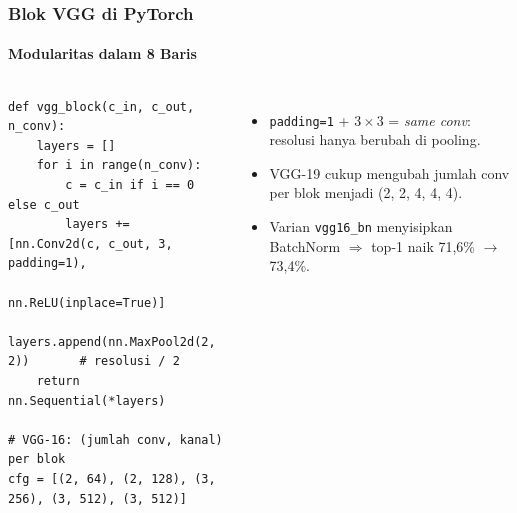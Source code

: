 \documentclass[t,aspectratio=169,xcolor=dvipsnames]{beamer}
\begin{document}
\begin{frame}[fragile]
    \frametitle{Blok VGG di PyTorch}
    \framesubtitle{Modularitas dalam 8 Baris}
    \footnotesize

    \begin{columns}[T]
\begin{lstlisting}[style=py]
def vgg_block(c_in, c_out, n_conv):
    layers = []
    for i in range(n_conv):
        c = c_in if i == 0 else c_out
        layers += [nn.Conv2d(c, c_out, 3, padding=1),
                   nn.ReLU(inplace=True)]
    layers.append(nn.MaxPool2d(2, 2))       # resolusi / 2
    return nn.Sequential(*layers)

# VGG-16: (jumlah conv, kanal) per blok
cfg = [(2, 64), (2, 128), (3, 256), (3, 512), (3, 512)]
\end{lstlisting}

        \begin{itemize}
            \item \texttt{padding=1} + $3\times3$ = \textit{same conv}: resolusi hanya berubah di pooling.
            \item VGG-19 cukup mengubah jumlah conv per blok menjadi (2, 2, 4, 4, 4).
            \item Varian \texttt{vgg16\_bn} menyisipkan BatchNorm $\Rightarrow$ top-1 naik 71,6\% $\to$ 73,4\%.
        \end{itemize}
    \end{columns}
\end{frame}
\end{document}
